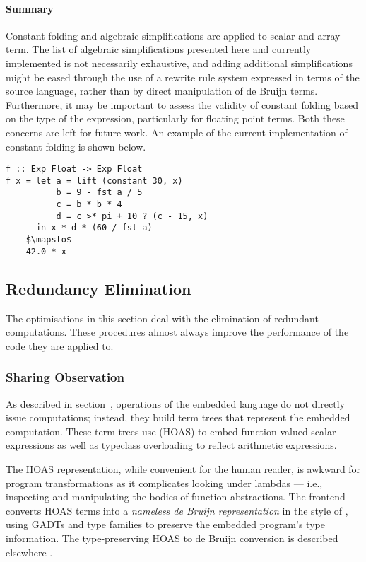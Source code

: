 \paragraph{Summary}

Constant folding and algebraic simplifications are applied to scalar and array
term. The list of algebraic simplifications presented here and currently
implemented is not necessarily exhaustive, and adding additional simplifications
might be eased through the use of a rewrite rule system expressed in terms of
the source language, rather than by direct manipulation of de Bruijn terms.
Furthermore, it may be important to assess the validity of constant folding
based on the type of the expression, particularly for floating point
terms. Both these concerns are left for future work. An example of the current
implementation of constant folding is shown below.

\begin{lstlisting}[style=Haskell,mathescape,caption={Example of constant expression evaluation}]
f :: Exp Float -> Exp Float
f x = let a = lift (constant 30, x)
          b = 9 - fst a / 5
          c = b * b * 4
          d = c >* pi + 10 ? (c - 15, x)
      in x * d * (60 / fst a)
    $\mapsto$
    42.0 * x
\end{lstlisting}


\subsection{Redundancy Elimination}

The optimisations in this section deal with the elimination of redundant
computations. These procedures almost always improve the performance of the code
they are applied to.

\subsubsection{Sharing Observation}

As described in section~\derp, operations of the embedded language do not
directly issue computations; instead, they build term trees that represent
the embedded computation. These term trees use  (HOAS)
to embed function-valued scalar expressions as well as typeclass overloading to
reflect arithmetic expressions.

The HOAS representation, while convenient for the human reader, is awkward for
program transformations as it complicates looking under lambdas --- i.e.,
inspecting and manipulating the bodies of function abstractions. The frontend
converts HOAS terms into a \emph{nameless de Bruijn representation}  in the style of \citet{Altenkirch:2003kz}, using GADTs \cite{Jones:2006}
and type families \cite{Chakravarty:2005a,Schrijvers:2008} to preserve the
embedded program's type information. The type-preserving HOAS to de Bruijn
conversion is described elsewhere \cite{Atkey:2009,Chakravarty:2009uo}.

